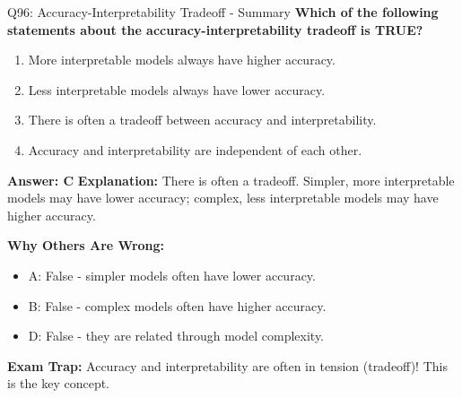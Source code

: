 \documentclass[8pt]{beamer}
\begin{document}
	\begin{frame}{Q96: Accuracy-Interpretability Tradeoff - Summary}
		\fontsize{6.5}{7.5}\selectfont
		\textbf{Which of the following statements about the accuracy-interpretability tradeoff is TRUE?}
		
		\begin{enumerate}
			\item More interpretable models always have higher accuracy.
			\item Less interpretable models always have lower accuracy.
			\item There is often a tradeoff between accuracy and interpretability.
			\item Accuracy and interpretability are independent of each other.
		\end{enumerate}
		
		\vspace{0.05cm}
		\textcolor{myblue}{\textbf{Answer: C}}
		\vspace{0.05cm}
		\textcolor{myblue}{\textbf{Explanation:}} There is often a tradeoff. Simpler, more interpretable models may have lower accuracy; complex, less interpretable models may have higher accuracy.
		
		\vspace{0.05cm}
		\textcolor{myred}{\textbf{Why Others Are Wrong:}}
		\begin{itemize}
			\item \textcolor{myred}{A:} False - simpler models often have lower accuracy.
			\item \textcolor{myred}{B:} False - complex models often have higher accuracy.
			\item \textcolor{myred}{D:} False - they are related through model complexity.
		\end{itemize}
		
		\textcolor{myred}{\textbf{Exam Trap:}} Accuracy and interpretability are often \textcolor{myblue}{in tension} (tradeoff)! This is the key concept.
	\end{frame}
	
\end{document}
